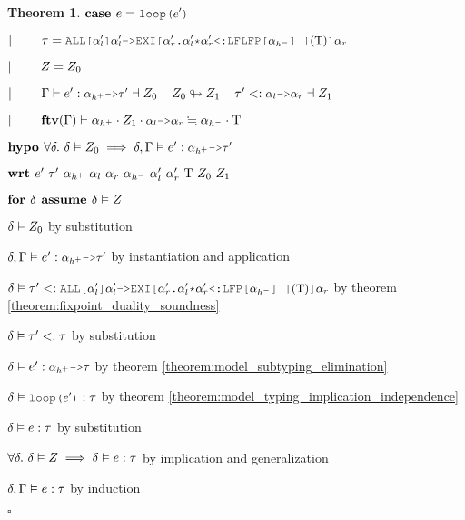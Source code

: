 \documentclass[acmsmall]{acmart}
\theoremstyle{definition}
\newtheorem{theorem}{Theorem}[section]
\begin{document}
\begin{theorem}
  \item \Z $\B{case } 
    e = \J{loop($e'$)} 
  $ 
  \item \Z $\contin  
    \tau = \J{ALL[$\alpha_l'$]$\alpha_l'$->EXI[$\alpha_r'$.$\alpha_l'$*$\alpha_r'$<:LFLFP[$\alpha_{h^-}$] |$(\Tau)$]$\alpha_r$} 
  $
  \item \Z $|\ \ \ \ \ \ \  
    Z = Z_0 
  $
  \item \Z $\contin  
    \Gamma \entails e' \hastype \J{$\alpha_{h^+}$->$\tau'$} \given Z_0
    \I
    Z_0 \looparrowright Z_1
    \I
    \tau' \subtypes \J{$\alpha_l$->$\alpha_r$} \given Z_1
  $ 
  \item \Z $\contin  
    \textbf{ftv}(\Gamma) \entails \alpha_{h^+} \cdot Z_1 \cdot \J{$\alpha_l$->$\alpha_r$} \fallingdotseq \alpha_{h^-} \cdot \Tau
  $
  \item \Z $\B{hypo } 
    \forall \delta .\ \delta \satisfies Z_0 \implies
    \delta, \Gamma \satisfies e' \hastype \J{$\alpha_{h^+}$->$\tau'$}
  $ 
  \item \Z $\B{wrt } e'\ \tau'\ \alpha_{h^+}\ \alpha_l\ \alpha_r\ \alpha_{h^-}\ \alpha_l'\ \alpha_r'\ \Tau\ Z_0\ Z_1 $ 
    \item \Z\Z $\textbf{for } \delta \textbf{ assume } \delta \vDash Z$
      \item \Z\Z\Z $\delta \vDash Z_0$ by substitution
      \item \Z\Z\Z $
        \delta, \Gamma \satisfies e' \hastype \J{$\alpha_{h^+}$->$\tau'$}
      $ by instantiation and application
      \item \Z\Z\Z $
        \delta \satisfies \tau' \subtypes 
        \J{ALL[$\alpha_l'$]$\alpha_l'$->EXI[$\alpha_r'$.$\alpha_l'$*$\alpha_r'$<:LFP[$\alpha_{h^-}$] |$(\Tau)$]$\alpha_r$}
      $ by theorem \ref{theorem:fixpoint_duality_soundness}

      \item \Z\Z\Z $
        \delta \vDash \tau' <: \tau
      $ by substitution  

      \item \Z\Z\Z $
        \delta \satisfies e' \hastype \J{$\alpha_{h^+}$->$\tau$}
      $ by theorem \ref{theorem:model_subtyping_elimination} 

      \item \Z\Z\Z $
        \delta \satisfies \J{loop($e'$)} \hastype \tau 
      $ by theorem \ref{theorem:model_typing_implication_independence}

      \item \Z\Z\Z $
        \delta \vDash e : \tau 
      $ by substitution 

    \item \Z\Z $
      \forall \delta .\ \delta \vDash Z \implies \delta \vDash e : \tau 
    $ by implication and generalization 

  \item \Z $\delta, \Gamma \vDash e : \tau$
    by induction
  \item $\square$
\end{theorem}
\end{document}
